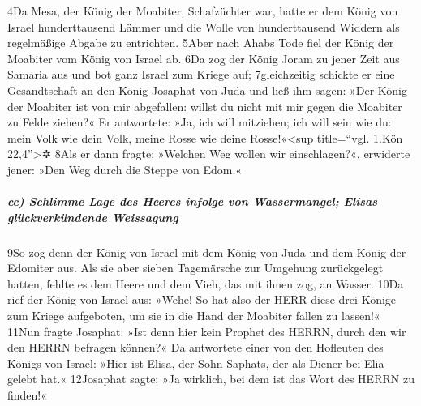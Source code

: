 4Da Mesa, der König der Moabiter, Schafzüchter war, hatte er dem König
von Israel hunderttausend Lämmer und die Wolle von hunderttausend
Widdern als regelmäßige Abgabe zu entrichten. 5Aber nach Ahabs Tode fiel
der König der Moabiter vom König von Israel ab. 6Da zog der König Joram
zu jener Zeit aus Samaria aus und bot ganz Israel zum Kriege auf;
7gleichzeitig schickte er eine Gesandtschaft an den König Josaphat von
Juda und ließ ihm sagen: »Der König der Moabiter ist von mir abgefallen:
willst du nicht mit mir gegen die Moabiter zu Felde ziehen?« Er
antwortete: »Ja, ich will mitziehen; ich will sein wie du: mein Volk wie
dein Volk, meine Rosse wie deine Rosse!«\textless sup title=``vgl. 1.Kön
22,4''\textgreater✲ 8Als er dann fragte: »Welchen Weg wollen wir
einschlagen?«, erwiderte jener: »Den Weg durch die Steppe von Edom.«

\hypertarget{cc-schlimme-lage-des-heeres-infolge-von-wassermangel-elisas-gluxfcckverkuxfcndende-weissagung}{%
\subparagraph{cc) Schlimme Lage des Heeres infolge von Wassermangel;
Elisas glückverkündende
Weissagung}\label{cc-schlimme-lage-des-heeres-infolge-von-wassermangel-elisas-gluxfcckverkuxfcndende-weissagung}}

9So zog denn der König von Israel mit dem König von Juda und dem König
der Edomiter aus. Als sie aber sieben Tagemärsche zur Umgehung
zurückgelegt hatten, fehlte es dem Heere und dem Vieh, das mit ihnen
zog, an Wasser. 10Da rief der König von Israel aus: »Wehe! So hat also
der HERR diese drei Könige zum Kriege aufgeboten, um sie in die Hand der
Moabiter fallen zu lassen!« 11Nun fragte Josaphat: »Ist denn hier kein
Prophet des HERRN, durch den wir den HERRN befragen können?« Da
antwortete einer von den Hofleuten des Königs von Israel: »Hier ist
Elisa, der Sohn Saphats, der als Diener bei Elia gelebt hat.« 12Josaphat
sagte: »Ja wirklich, bei dem ist das Wort des HERRN zu finden!«

